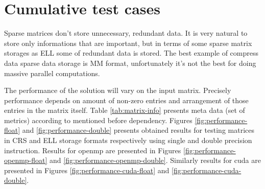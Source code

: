 \chapter{Cumulative test cases}
	Sparse matrices don't store unnecessary, redundant data. It is very natural to store only informations that are important, but in terms of some sparse matrix storages as \gls{ELL} some of redundant data is stored. The best example of compress data sparse data storage is \gls{MM} format, unfortunately it's not the best for doing massive parallel computations.
	
	The performance of the solution will vary on the input matrix. Precisely performance depends on amount of non-zero entries and arrangement of those entries in the matrix itself. Table \ref{tab:matrix-info} presents meta data (set of metrics) according to mentioned before dependency. Figures \ref{fig:performance-float} and \ref{fig:performance-double} presents obtained results for testing matrices in \gls{CRS} and \gls{ELL} storage formats respectively using single and double precision instruction. Results for \gls{openmp} are presented in Figures \ref{fig:performance-openmp-float} and \ref{fig:performance-openmp-double}. Similarly results for \gls{cuda} are presented in Figures \ref{fig:performance-cuda-float} and \ref{fig:performance-cuda-double}.
	
